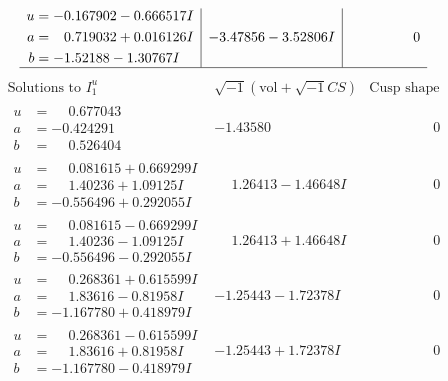 \documentclass[1p]{elsarticle_modified}
\theoremstyle{definition}
\newcommand{\I}{\sqrt{-1}}
\begin{document}
$$\begin{array}{c|c|c}
\begin{aligned}
u &= -0.167902 - 0.666517 I \\
a &= \phantom{-}0.719032 + 0.016126 I \\
b &= -1.52188 - 1.30767 I\end{aligned}
 & -3.47856 - 3.52806 I & \phantom{-0.000000 } 0\\
 \hline 
 \end{array}$$\newpage$$\begin{array}{c|c|c}  
\text{Solutions to }I^u_{1}& \I (\text{vol} + \sqrt{-1}CS) & \text{Cusp shape}\\
 \hline 
\begin{aligned}
u &= \phantom{-}0.677043\phantom{ +0.000000I} \\
a &= -0.424291\phantom{ +0.000000I} \\
b &= \phantom{-}0.526404\phantom{ +0.000000I}\end{aligned}
 & -1.43580\phantom{ +0.000000I} & \phantom{-0.000000 } 0 \\ \hline\begin{aligned}
u &= \phantom{-}0.081615 + 0.669299 I \\
a &= \phantom{-}1.40236 + 1.09125 I \\
b &= -0.556496 + 0.292055 I\end{aligned}
 & \phantom{-}1.26413 - 1.46648 I & \phantom{-0.000000 } 0 \\ \hline\begin{aligned}
u &= \phantom{-}0.081615 - 0.669299 I \\
a &= \phantom{-}1.40236 - 1.09125 I \\
b &= -0.556496 - 0.292055 I\end{aligned}
 & \phantom{-}1.26413 + 1.46648 I & \phantom{-0.000000 } 0 \\ \hline\begin{aligned}
u &= \phantom{-}0.268361 + 0.615599 I \\
a &= \phantom{-}1.83616 - 0.81958 I \\
b &= -1.167780 + 0.418979 I\end{aligned}
 & -1.25443 - 1.72378 I & \phantom{-0.000000 } 0 \\ \hline\begin{aligned}
u &= \phantom{-}0.268361 - 0.615599 I \\
a &= \phantom{-}1.83616 + 0.81958 I \\
b &= -1.167780 - 0.418979 I\end{aligned}
 & -1.25443 + 1.72378 I & \phantom{-0.000000 } 0 \\ \hline\begin{aligned}

\end{aligned}
\end{array}$$
\end{document}
